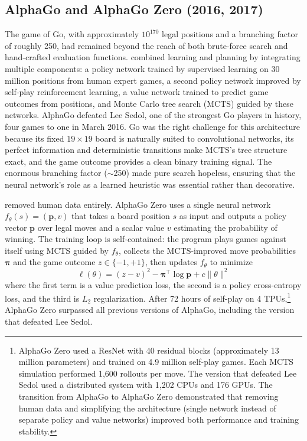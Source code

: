 \subsection{AlphaGo and AlphaGo Zero (2016, 2017)}

The game of Go, with approximately $10^{170}$ legal positions and a branching factor of roughly 250, had remained beyond the reach of both brute-force search and hand-crafted evaluation functions. \citet{Silver2016} combined learning and planning by integrating multiple components: a policy network trained by supervised learning on 30 million positions from human expert games, a second policy network improved by self-play reinforcement learning, a value network trained to predict game outcomes from positions, and Monte Carlo tree search (MCTS) guided by these networks. AlphaGo defeated Lee Sedol, one of the strongest Go players in history, four games to one in March 2016. Go was the right challenge for this architecture because its fixed $19 \times 19$ board is naturally suited to convolutional networks, its perfect information and deterministic transitions make MCTS's tree structure exact, and the game outcome provides a clean binary training signal. The enormous branching factor ($\sim$250) made pure search hopeless, ensuring that the neural network's role as a learned heuristic was essential rather than decorative.

\citet{Silver2017} removed human data entirely. AlphaGo Zero uses a single neural network $f_\theta(s) = (\mathbf{p}, v)$ that takes a board position $s$ as input and outputs a policy vector $\mathbf{p}$ over legal moves and a scalar value $v$ estimating the probability of winning. The training loop is self-contained: the program plays games against itself using MCTS guided by $f_\theta$, collects the MCTS-improved move probabilities $\boldsymbol{\pi}$ and the game outcome $z \in \{-1, +1\}$, then updates $f_\theta$ to minimize
\begin{equation}
\ell(\theta) = (z - v)^2 - \boldsymbol{\pi}^\top \log \mathbf{p} + c \|\theta\|^2
\end{equation}
where the first term is a value prediction loss, the second is a policy cross-entropy loss, and the third is $L_2$ regularization. After 72 hours of self-play on 4 TPUs,\footnote{AlphaGo Zero used a ResNet with 40 residual blocks (approximately 13 million parameters) and trained on 4.9 million self-play games. Each MCTS simulation performed 1{,}600 rollouts per move. The version that defeated Lee Sedol used a distributed system with 1{,}202 CPUs and 176 GPUs. The transition from AlphaGo to AlphaGo Zero demonstrated that removing human data and simplifying the architecture (single network instead of separate policy and value networks) improved both performance and training stability.} AlphaGo Zero surpassed all previous versions of AlphaGo, including the version that defeated Lee Sedol.

